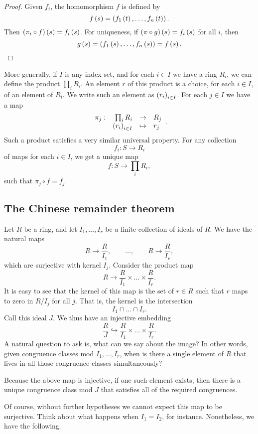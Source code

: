 \begin{proof}
Given $ f_i $, the homomorphism $ f $ is defined by
$$ f\left( s \right) = \left( f_1\left( t \right), \dots, f_n\left( t \right) \right). $$
Then $ \left( \pi_i \circ f \right)\left( s \right) = f_i\left( s \right) $. For uniqueness, if $ \left( \pi \circ g \right)\left( s \right) = f_i\left( s \right) $ for all $ i $, then
$$ g\left( s \right) = \left( f_1\left( s \right), \dots, f_n\left( s \right) \right) = f\left( s \right). $$
\end{proof}

More generally, if $ I $ is any index set, and for each $ i \in I $ we have a ring $ R_i $, we can define the product $ \prod_i R_i $. An element $ r $ of this product is a choice, for each $ i \in I $, of an element of $ R_i $. We write such an element as $ \left( r_i \right)_{i \in I} $. For each $ j \in I $ we have a map
$$ \function[\pi_j]{\prod_i R_i}{R_j}{\rb{r_i}_{i \in I}}{r_j}. $$
Such a product satisfies a very similar universal property. For any collection
$$ f_i : S \to R_i $$
of maps for each $ i \in I $, we get a unique map
$$ f : S \to \prod_i R_i, $$
such that $ \pi_j \circ f = f_j $.

\subsection{The Chinese remainder theorem}

Let $ R $ be a ring, and let $ I_1, \dots, I_r $ be a finite collection of ideals of $ R $. We have the natural maps
$$ R \to \dfrac{R}{I_1}, \qquad \dots, \qquad R \to \dfrac{R}{I_r}, $$
which are surjective with kernel $ I_j $. Consider the product map
$$ R \to \dfrac{R}{I_1} \times \dots \times \dfrac{R}{I_r}. $$
It is easy to see that the kernel of this map is the set of $ r \in R $ such that $ r $ maps to zero in $ R / I_j $ for all $ j $. That is, the kernel is the intersection
$$ I_1 \cap \dots \cap I_r. $$
Call this ideal $ J $. We thus have an injective embedding
$$ \dfrac{R}{J} \hookrightarrow \dfrac{R}{I_1} \times \dots \times \dfrac{R}{I_r}. $$
A natural question to ask is, what can we say about the image? In other words, given congruence classes mod $ I_1, \dots, I_r $, when is there a single element of $ R $ that lives in all those congruence classes simultaneously?

\begin{note*}
Because the above map is injective, if one such element exists, then there is a unique congruence class mod $ J $ that satisfies all of the required congruences.
\end{note*}

Of course, without further hypotheses we cannot expect this map to be surjective. Think about what happens when $ I_1 = I_2 $, for instance. Nonetheless, we have the following.

